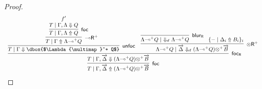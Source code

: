 \documentclass[runningheads]{llncs}
\renewcommand{\vec}{\overrightarrow}
\newcommand{\tr}{\otimes \mathsf{R}}
\newcommand{\lright}{{\multimap}\mathsf{R}}
\newcommand{\otR}{\tr}
\newcommand{\lolliR}{\lright}
\newcommand{\ot}{\otimes}
\newcommand{\lolli}{\multimap}
\newcommand{\rf}{\dn_\mathsf{rf}}%
\newcommand{\proofbox}[1]{\begin{tabular}{l} #1 \end{tabular}}
\newcommand{\up}{\Uparrow}
\newcommand{\dn}{\Downarrow}
\newcommand{\foc}{\mathsf{foc}}
\newcommand{\focR}{\mathsf{foc_R}}
\newcommand{\blurR}{\mathsf{blur_R}}
\newcommand{\unfoc}{\mathsf{unfoc}}
\begin{document}
\begin{proof}
  \begin{equation}\label{eq:otR+foc}
    \small    
    \proofbox{
  \infer[\foc]{T \mid \Gamma , \vec{\Delta} \up (\Lambda {\lolli}^+ Q) {\ot}^+ \vec{B}}{
    \infer[\focR]{T \mid \Gamma , \vec{\Delta} \dn (\Lambda {\lolli}^+ Q) {\ot}^+ \vec{B}}{
      \infer[\unfoc]{T \mid \Gamma \dn \dbox{$\Lambda {\lolli}^+ Q$}}{
        \infer[\lolliR^+]{T \mid \Gamma \up \Lambda {\lolli}^+ Q}{
          \infer[\foc]{T \mid \Gamma , \Lambda \up Q}{
            \deduce{T \mid \Gamma , \Lambda \dn Q}{f'}
          }
        }
      }
      & 
      \infer[\otR^+]{\Lambda {\lolli}^+ Q \mid \vec{\Delta} \rf (\Lambda {\lolli}^+ Q) {\ot}^+ \vec{B}}{
        \infer[\blurR]{\Lambda {\lolli}^+ Q \mid ~ \rf \Lambda {\lolli}^+ Q}{}
        &
        \! \{ - \mid \Delta_i \up B_i \}_{i}
      }
    }
  }
  }
  \end{equation}
\end{proof}
\end{document}
